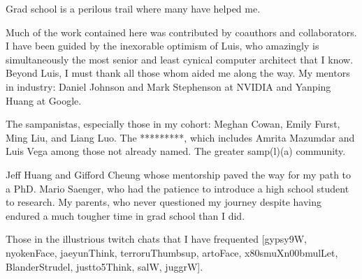 Grad school is a perilous trail where many have helped me.

Much of the work contained here was contributed by coauthors and collaborators.
I have been guided by the inexorable optimism of Luis, who amazingly is simultaneously the most senior and least cynical computer architect that I know.
Beyond Luis, I must thank all those whom aided me along the way.
My mentors in industry: Daniel Johnson and Mark Stephenson at NVIDIA and Yanping Huang at Google.

The sampanistas, especially those in my cohort: Meghan Cowan, Emily Furst, Ming Liu, and Liang Luo.
The *********, which includes Amrita Mazumdar and Luis Vega among those not already named. 
The greater samp(l)(a) community.

Jeff Huang and Gifford Cheung whose mentorship paved the way for my path to a PhD.
Mario Saenger, who had the patience to introduce a high school student to research.
My parents, who never questioned my journey despite having endured a much tougher time in grad school than I did.

Those in the illustrious twitch chats that I have frequented [gypsy9W, nyokenFace, jaeyunThink, terroruThumbsup, artoFace, x80smuXn00bmulLet, BlanderStrudel, justto5Think, salW, juggrW].
